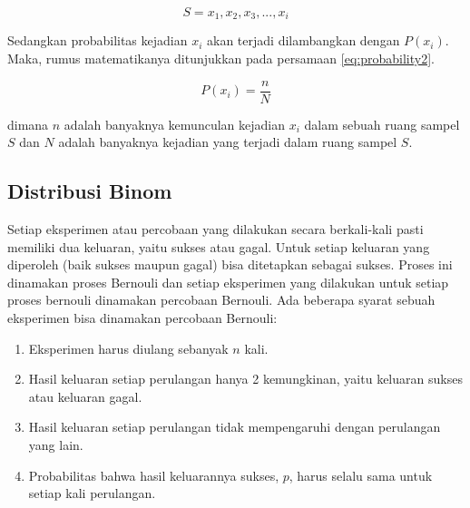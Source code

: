 \begin{equation}
	S = {x_1, x_2, x_3, ..., x_i}
	\label{eq:probability1}
\end{equation}

Sedangkan probabilitas kejadian \begin{math}x_i\end{math} akan terjadi dilambangkan dengan \begin{math}P(x_i)\end{math}. Maka, rumus matematikanya ditunjukkan pada persamaan \ref{eq:probability2}.

\begin{equation}
	P(x_i) = \frac{n}{N}
	\label{eq:probability2}
\end{equation}

\noindent dimana \begin{math}n\end{math} adalah banyaknya kemunculan kejadian \begin{math}x_i\end{math} dalam sebuah ruang sampel \begin{math}S\end{math} dan \begin{math}N\end{math} adalah banyaknya kejadian yang terjadi dalam ruang sampel \begin{math}S\end{math}.

\subsection{Distribusi Binom}

Setiap eksperimen atau percobaan yang dilakukan secara berkali-kali pasti memiliki dua keluaran, yaitu sukses atau gagal. Untuk setiap keluaran yang diperoleh (baik sukses maupun gagal) bisa ditetapkan sebagai sukses. Proses ini dinamakan proses Bernouli dan setiap eksperimen yang dilakukan untuk setiap proses bernouli dinamakan percobaan Bernouli. Ada beberapa syarat sebuah eksperimen bisa dinamakan percobaan Bernouli\cite{walpole1993probability}:
\begin{enumerate}
	\item Eksperimen harus diulang sebanyak \begin{math}n\end{math} kali.
	\item Hasil keluaran setiap perulangan hanya 2 kemungkinan, yaitu keluaran sukses atau keluaran gagal.
	\item Hasil keluaran setiap perulangan tidak mempengaruhi dengan perulangan yang lain.
	\item Probabilitas bahwa hasil keluarannya sukses, \begin{math}p\end{math}, harus selalu sama untuk setiap kali perulangan.
\end{enumerate}


